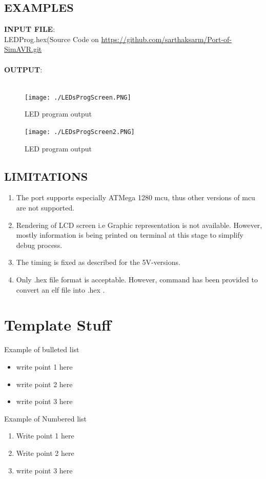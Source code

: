 \documentclass[12pt]{article}
\begin{document}
\subsection{EXAMPLES}
\textbf{INPUT FILE}: \\LEDProg.hex(Source Code on \url{https://github.com/sarthaksarm/Port-of-SimAVR.git}\\\\
\textbf{OUTPUT}: \\ \\
\begin{figure}[h]
 \centering
 \texttt{[image: ./LEDsProgScreen.PNG]}
 \caption{LED program output\label{fig:output}}
\end{figure}
\pagebreak
\begin{figure}[h]
 \centering
 \texttt{[image: ./LEDsProgScreen2.PNG]}
 \caption{LED program output\label{fig:output}}
\end{figure}

\subsection{LIMITATIONS}
\begin{enumerate}
\item The port supports especially ATMega 1280 mcu, thus other versions of mcu are not supported.
\item Rendering of LCD screen i.e Graphic representation is not available. However, mostly information is being printed on terminal at this stage to simplify debug process.
\item The timing is fixed as described for the 5V-versions.
\item Only .hex file format is acceptable. However, command has been provided to convert an elf file into .hex .
\end{enumerate}
\pagebreak

\section{Template Stuff}

Example of bulleted list
\begin{itemize}
 \item write point 1 here \cite{SRS1998}\cite{SimpleCCP-Windows}
 \item write point 2 here
 \item write point 3 here
\end{itemize}

Example of Numbered list
\begin{enumerate}
 \item Write point 1 here
 \item Write point 2 here
 \item write point 3 here
\end{enumerate}
\end{document}
